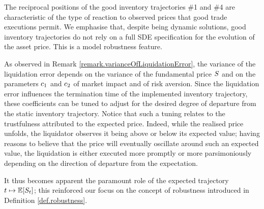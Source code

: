 \documentclass[10pt,a4paper]{article}
\begin{document}
The reciprocal positions of the good inventory trajectories \#1 and \#4 are characteristic of the type of reaction to observed prices that good trade executions permit.  We emphasise that, despite being dynamic solutions, good inventory trajectories do not rely on a full SDE specification for the evolution of the asset price. This is a model robustness feature. 

As observed in Remark \ref{remark.varianceOfLiquidationError}, the variance of the liquidation error depends on the variance of the fundamental price $S$ and on the parameters $c_{1}$ and $c_{2}$ of market impact and of risk aversion. Since the liquidation error influences the termination time of the implemented inventory trajectory, these coefficients can be tuned to adjust for the desired degree of departure from the static inventory trajectory.  Notice that such a tuning relates to the trustfulness attributed to the expected price. Indeed, while the realised price unfolds, the liquidator observes it being above or below its expected value; having reasons to believe that the price will eventually oscillate around such an expected value, the liquidation is either executed more promptly or more parsimoniously depending on the direction of departure from the expectation.  

It thus becomes apparent the paramount role of the expected trajectory $t\mapsto \mathbb{{E}}[S_t]$; this reinforced our focus on the concept of robustness introduced in Definition \ref{def.robustness}. 
\end{document}
